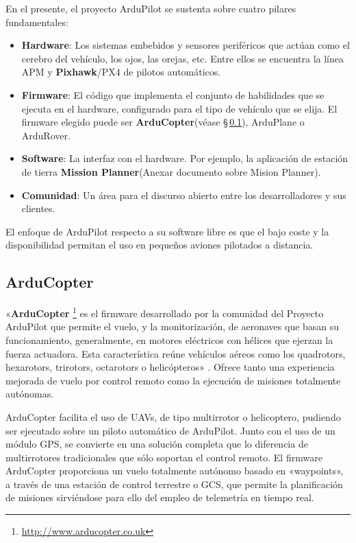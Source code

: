 
En el presente, el proyecto ArduPilot se sustenta sobre cuatro pilares fundamentales:

\begin{itemize}
\item \textbf{Hardware}: Los sistemas embebidos y sensores periféricos que actúan como el cerebro del vehículo, los ojos, las orejas, etc. Entre ellos se encuentra la línea APM y \textbf{Pixhawk}/PX4 de pilotos automáticos.
\item \textbf{Firmware}: El código que implementa el conjunto de habilidades que se ejecuta en el hardware, configurado para el 
tipo de vehículo que se elija. El firmware elegido puede ser \textbf{ArduCopter}(véase \S\,\ref{sec:arducopter}), ArduPlane o ArduRover.
\item \textbf{Software}: La interfaz con el hardware. Por ejemplo, la aplicación de estación de tierra \textbf{Mission Planner}(Anexar documento sobre Mision Planner).
\item \textbf{Comunidad}: Un área para el discurso abierto entre los desarrolladores y sus clientes.
\end{itemize}

El enfoque de ArduPilot respecto a su software libre es que el bajo coste y la disponibilidad permitan el uso en pequeños aviones 
pilotados a distancia.

\subsection{ArduCopter}
\label{sec:arducopter}

«\textbf{ArduCopter} \footnote{\url{http://www.arducopter.co.uk}} es el firmware desarrollado por la comunidad del Proyecto ArduPilot que permite el vuelo, y la monitorización, de aeronaves que basan su funcionamiento, generalmente, en motores eléctricos con hélices  que  ejerzan  la  fuerza  actuadora.  Esta característica  reúne  vehículos  aéreos  como  los  quadrotors, hexarotors, trirotors, octarotors o helicópteros» \cite{arducopter}. Ofrece tanto una experiencia mejorada de vuelo por control remoto como la ejecución de misiones totalmente autónomas.

ArduCopter facilita el uso de \acs{UAV}s, de tipo multirrotor o helicoptero, pudiendo ser ejecutado sobre un piloto automático de ArduPilot.
Junto con el uso de un módulo \acs{GPS}, se convierte en una solución completa que lo diferencia de multirrotores tradicionales que sólo 
soportan el control remoto. El firmware ArduCopter proporciona un vuelo totalmente autónomo basado en «waypoints», a través de 
una estación de control terrestre o \acs{GCS}, que permite la planificación de misiones sirviéndose para ello del empleo de telemetría en tiempo real.

